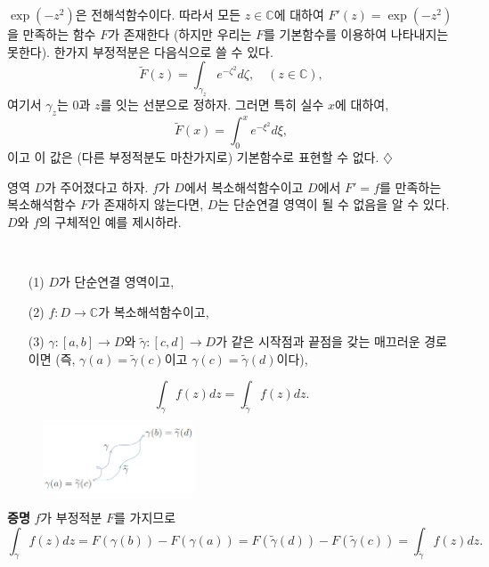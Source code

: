 \begin{salt_example} \label{example-3-10}
$\exp(-z^2)$은 전해석함수이다.
따라서 모든 $z\in\mathbb C$에 대하여 $F'(z)= \exp(-z^2)$을 만족하는 함수 $F$가 존재한다
(하지만 우리는 $F$를 기본함수를 이용하여 나타내지는 못한다).
한가지 부정적분은 다음식으로 쓸 수 있다.
\[
\tilde F(z) = \int_{\gamma_z} e^{-\zeta^2} d\zeta, \quad (z\in\mathbb C),
\]
여기서 $\gamma_z$는 $0$과 $z$를 잇는 선분으로 정하자.
그러면 특히 실수 $x$에 대하여,
\[
\tilde F(x) = \int_0^x e^{-\xi^2} d\xi,
\]
이고 이 값은 (다른 부정적분도 마찬가지로) 기본함수로 표현할 수 없다.
\hfill $\diamondsuit$
\end{salt_example}

\begin{salt_exercise} \label{ex-3-23}
영역 $D$가 주어졌다고 하자.
$f$가 $D$에서 복소해석함수이고 $D$에서 $F'=f$를 만족하는
복소해석함수 $F$가 존재하지 않는다면,
$D$는 단순연결 영역이 될 수 없음을 알 수 있다.
$D$와 $f$의 구체적인 예를 제시하라.
\end{salt_exercise}

\begin{salt_corollary} \label{coro-3-3}
\
\begin{itemize}
\item[(1)] $D$가 단순연결 영역이고,
\item[(2)] $f:D\to\mathbb C$가 복소해석함수이고,
\item[(3)] $\gamma :[a,b] \to D$와 $\tilde\gamma :[c,d] \to D$가 
같은 시작점과 끝점을 갖는 매끄러운 경로이면
(즉, $\gamma(a) = \tilde\gamma(c)$이고 $\gamma(c) = \tilde\gamma(d)$이다),
\end{itemize}
\[
\int_\gamma f(z) dz = \int_{\tilde\gamma} f(z)dz.
\]
\end{salt_corollary}

\begin{figure}[h!]
\begin{center}
\includegraphics[width=0.4\textwidth]{./SaltChapter/fig-3-0-6}
\end{center}
\end{figure}

{\bf 증명}
$f$가 부정적분 $F$를 가지므로
\[
\int_\gamma f(z) dz = F(\gamma(b)) - F(\gamma(a))
= F(\tilde\gamma(d)) - F(\tilde\gamma(c))
= \int_{\tilde\gamma} f(z)dz.
\]

